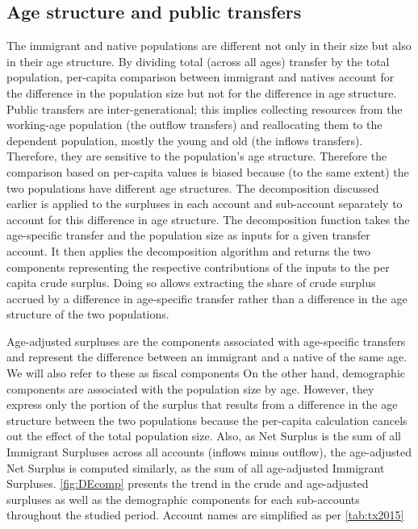 \subsection{Age structure and public transfers}
The immigrant and native populations are different not only in their size but also in their age structure.
By dividing total (across all ages) transfer by the total population, per-capita comparison between immigrant and natives account for the difference in the population size but not for the difference in age structure.
Public transfers are inter-generational; this implies collecting resources from the working-age population (the outflow transfers) and reallocating them to the dependent population, mostly the young and old (the inflows transfers).
Therefore, they are sensitive to the population's age structure.
Therefore the comparison based on per-capita values is biased because (to the same extent) the two populations have different age structures.
The decomposition discussed earlier is applied to the surpluses in each account and sub-account separately to account for this difference in age structure.
The decomposition function takes the age-specific transfer and the population size as inputs for a given transfer account. It then applies the decomposition algorithm and returns the two components representing the respective contributions of the inputs to the per capita crude surplus.
Doing so allows extracting the share of crude surplus accrued by a difference in age-specific transfer rather than a difference in the age structure of the two populations.

\vspace{0.7em}\par
Age-adjusted surpluses are the components associated with age-specific transfers and represent the difference between an immigrant and a native of the same age.
We will also refer to these as fiscal components
On the other hand, demographic components are associated with the population size by age.
However, they express only the portion of the surplus that results from a difference in the age structure between the two populations because the per-capita calculation cancels out the effect of the total population size.
Also, as Net Surplus is the sum of all Immigrant Surpluses across all accounts (inflows minus outflow), the age-adjusted Net Surplus is computed similarly, as the sum of all age-adjusted Immigrant Surpluses. \autoref{fig:DEcomp} presents the trend in the crude and age-adjusted surpluses as well as the demographic components for each sub-accounts throughout the studied period.
Account names are simplified as per \autoref{tab:tx2015}


